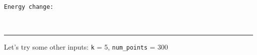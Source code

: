 \documentclass[11pt]{article}
\begin{document}
    \begin{center}
    \end{center}
    { \hspace*{\fill} \\}
    
    \begin{Verbatim}[commandchars=\\\{\}]

Energy change:

    \end{Verbatim}

    \begin{center}
    \end{center}
    { \hspace*{\fill} \\}
    
    \begin{center}\rule{0.5\linewidth}{\linethickness}\end{center}

Let's try some other inputs: \texttt{k} = 5, \texttt{num\_points} = 300
\end{document}
